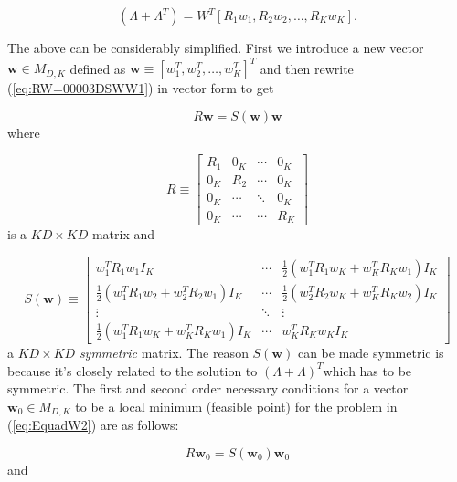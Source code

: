 \begin{equation}
(\Lambda+\Lambda^{T})=W^{T}\left[R_{1}w_{1},R_{2}w_{2},\ldots,R_{K}w_{K}\right].
\end{equation}

The above can be considerably simplified. First we introduce a new
vector $\mathbf{w}\in M_{D,K}$ defined as $\mathbf{w}\equiv\left[w_{1}^{T},w_{2}^{T},\ldots,w_{K}^{T}\right]^{T}$
and then rewrite (\ref{eq:RW=00003DSWW1}) in vector form to get 

\begin{equation}
R\mathbf{w}=S(\mathbf{w})\mathbf{w}
\end{equation}
where 

\begin{equation}
R\equiv\left[\begin{array}{cccc}
R_{1} & 0_{K} & \cdots & 0_{K}\\
0_{K} & R_{2} & \cdots & 0_{K}\\
0_{K} & \cdots & \ddots & 0_{K}\\
0_{K} & \cdots & \cdots & R_{K}
\end{array}\right]\label{eq:Rdef}
\end{equation}
is a $KD\times KD$ matrix and 

\begin{equation}
S(\mathbf{w})\equiv\left[\begin{array}{ccc}
w_{1}^{T}R_{1}w_{1}I_{K} & \cdots & \frac{1}{2}\left(w_{1}^{T}R_{1}w_{K}+w_{K}^{T}R_{K}w_{1}\right)I_{K}\\
\frac{1}{2}\left(w_{1}^{T}R_{1}w_{2}+w_{2}^{T}R_{2}w_{1}\right)I_{K} & \cdots & \frac{1}{2}\left(w_{2}^{T}R_{2}w_{K}+w_{K}^{T}R_{K}w_{2}\right)I_{K}\\
\vdots & \ddots & \vdots\\
\frac{1}{2}\left(w_{1}^{T}R_{1}w_{K}+w_{K}^{T}R_{K}w_{1}\right)I_{K} & \cdots & w_{K}^{T}R_{K}w_{K}I_{K}
\end{array}\right]\label{eq:S(w)}
\end{equation}
a $KD\times KD$ \emph{symmetric} matrix. The reason $S(\mathbf{w})$
can be made symmetric is because it's closely related to the solution
to $(\Lambda+\Lambda)^{T}$\textemdash which has to be symmetric.
The first and second order necessary conditions for a vector $\mathbf{w}_{0}\in M_{D,K}$
to be a local minimum (feasible point) for the problem in (\ref{eq:EquadW2})
are as follows:

\begin{equation}
R\mathbf{w}_{0}=S(\mathbf{w}_{0})\mathbf{w}_{0}\label{eq:1storderneccond}
\end{equation}
and 

